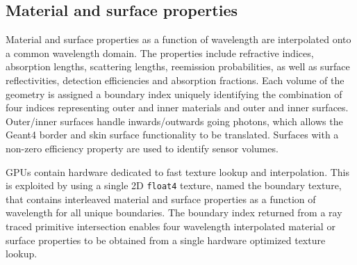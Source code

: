 \documentclass{webofc}
\begin{document}
\subsection{Material and surface properties} 
%
Material and surface properties as a function of wavelength are interpolated onto a common wavelength domain.
The properties include refractive indices, absorption lengths, scattering lengths, reemission probabilities, 
as well as surface reflectivities, detection efficiencies and absorption fractions. 
Each volume of the geometry is assigned a boundary index uniquely identifying the combination of four indices representing 
outer and inner materials and outer and inner surfaces. Outer/inner surfaces handle inwards/outwards going photons, which allows the Geant4 border and skin
surface functionality to be translated. Surfaces with a non-zero efficiency property are used to identify sensor volumes. 

GPUs contain hardware dedicated to fast texture lookup and interpolation.
This is exploited by using a single 2D {\tt float4} texture, named the boundary texture,
that contains interleaved material and surface properties as a function of wavelength for all
unique boundaries.
The boundary index returned from a ray traced primitive intersection
enables four wavelength interpolated material or surface properties to be
obtained from a single hardware optimized texture lookup.
%
\end{document}
